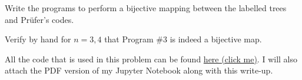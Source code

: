 \question
  Write the programs to perform a bijective mapping between the labelled trees and Prüfer's codes.
  Verify by hand for $n=3,4$ that Program \#3 is indeed a bijective map.

  \begin{solution}
    All the code that is used in this problem can be found
    \href{https://github.com/nngerncham/ma484_graphcomb/blob/main/homework/hw2/codebase/Problem6.ipynb}
    {here (click me)}. I will also attach the PDF version of my Jupyter 
    Notebook along with this write-up.
  \end{solution}
